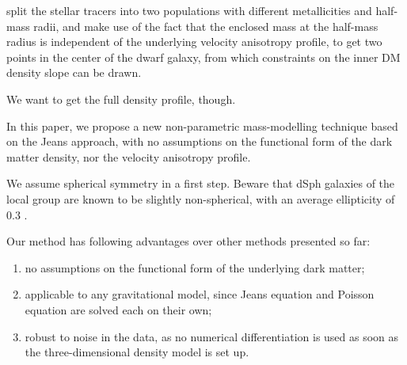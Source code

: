 
\citet{WalkerPenarrubia2011} split the stellar tracers into two
populations with different metallicities and half-mass radii, and make
use of the fact that the enclosed mass at the half-mass radius is
independent of the underlying velocity anisotropy profile, to get two
points in the center of the dwarf galaxy, from which constraints on
the inner DM density slope can be drawn.




We want to get the full density profile, though.

In this paper, we propose a new non-parametric mass-modelling
technique based on the Jeans approach, with no assumptions on the
functional form of the dark matter density, nor the velocity
anisotropy profile.



We assume spherical symmetry in a first step. Beware that dSph
galaxies of the local group are known to be slightly non-spherical,
with an average ellipticity of 0.3 .



Our method has following advantages over other methods presented so far:

\begin{enumerate}
\item no assumptions on the functional form of the underlying dark
  matter;
\item applicable to any gravitational model, since Jeans equation and
  Poisson equation are solved each on their own;
\item robust to noise in the data, as no numerical differentiation is
  used as soon as the three-dimensional density model is set up.
\end{enumerate}
